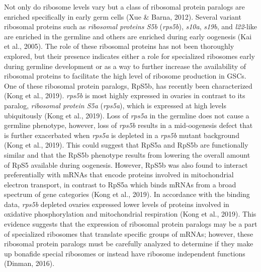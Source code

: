 \documentclass[12pt,twoside]{reedthesis}
\begin{document}
Not only do ribosome levels vary but a class of ribosomal protein
paralogs are enriched specifically in early germ cells (Xue \& Barna, 2012).
Several variant ribosomal proteins such as \emph{ribosomal proteins S5b}
(\emph{rps5b}), \emph{s10a}, \emph{s19b}, and \emph{l22}-like are enriched in the germline
and others are enriched during early oogenesis (Kai et al., 2005). The role
of these ribosomal proteins has not been thoroughly explored, but their
presence indicates either a role for specialized ribosomes early during
germline development or as a way to further increase the availability of
ribosomal proteins to facilitate the high level of ribosome production
in GSCs. One of these ribosomal protein paralogs, RpS5b, has recently
been characterized (Kong et al., 2019). \emph{rps5b} is most highly expressed in
ovaries in contrast to its paralog, \emph{ribosomal protein S5a} (\emph{rps5a}),
which is expressed at high levels ubiquitously (Kong et al., 2019). Loss of
\emph{rps5a} in the germline does not cause a germline phenotype, however,
loss of \emph{rps5b} results in a mid-oogenesis defect that is further
exacerbated when \emph{rps5a} is depleted in a \emph{rps5b} mutant background
(Kong et al., 2019). This could suggest that RpS5a and RpS5b are functionally
similar and that the RpS5b phenotype results from lowering the overall
amount of RpS5 available during oogenesis. However, RpS5b was also found
to interact preferentially with mRNAs that encode proteins involved in
mitochondrial electron transport, in contrast to RpS5a which binds mRNAs
from a broad spectrum of gene categories (Kong et al., 2019). In accordance
with the binding data, \emph{rps5b} depleted ovaries expressed lower levels
of proteins involved in oxidative phosphorylation and mitochondrial
respiration (Kong et al., 2019). This evidence suggests that the expression
of ribosomal protein paralogs may be a part of specialized ribosomes
that translate specific groups of mRNAs; however, these ribosomal
protein paralogs must be carefully analyzed to determine if they make up
bonafide special ribosomes or instead have ribosome independent
functions (Dinman, 2016).
\end{document}
